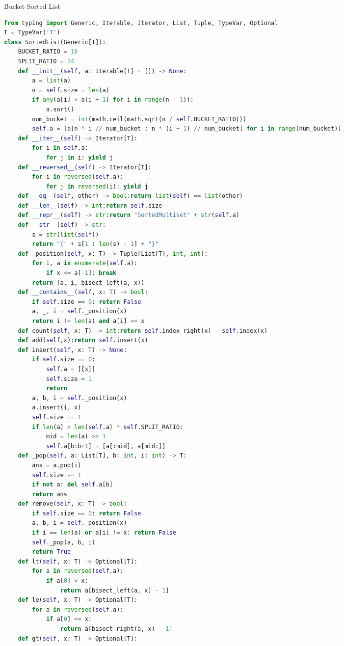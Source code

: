 \documentclass[10pt,landscape, a4paper]{article}
\begin{document}
\begin{multicols*}{3}
Bucket Sorted List
\begin{lstlisting}[language=Python]
from typing import Generic, Iterable, Iterator, List, Tuple, TypeVar, Optional
T = TypeVar('T')
class SortedList(Generic[T]):
    BUCKET_RATIO = 16
    SPLIT_RATIO = 24
    def __init__(self, a: Iterable[T] = []) -> None:
        a = list(a)
        n = self.size = len(a)
        if any(a[i] > a[i + 1] for i in range(n - 1)):
            a.sort()
        num_bucket = int(math.ceil(math.sqrt(n / self.BUCKET_RATIO)))
        self.a = [a[n * i // num_bucket : n * (i + 1) // num_bucket] for i in range(num_bucket)]
    def __iter__(self) -> Iterator[T]:
        for i in self.a:
            for j in i: yield j
    def __reversed__(self) -> Iterator[T]:
        for i in reversed(self.a):
            for j in reversed(i): yield j
    def __eq__(self, other) -> bool:return list(self) == list(other)
    def __len__(self) -> int:return self.size
    def __repr__(self) -> str:return "SortedMultiset" + str(self.a)
    def __str__(self) -> str:
        s = str(list(self))
        return "{" + s[1 : len(s) - 1] + "}"
    def _position(self, x: T) -> Tuple[List[T], int, int]:
        for i, a in enumerate(self.a):
            if x <= a[-1]: break
        return (a, i, bisect_left(a, x))
    def __contains__(self, x: T) -> bool:
        if self.size == 0: return False
        a, _, i = self._position(x)
        return i != len(a) and a[i] == x
    def count(self, x: T) -> int:return self.index_right(x) - self.index(x)
    def add(self,x):return self.insert(x)
    def insert(self, x: T) -> None:
        if self.size == 0:
            self.a = [[x]]
            self.size = 1
            return
        a, b, i = self._position(x)
        a.insert(i, x)
        self.size += 1
        if len(a) > len(self.a) * self.SPLIT_RATIO:
            mid = len(a) >> 1
            self.a[b:b+1] = [a[:mid], a[mid:]]
    def _pop(self, a: List[T], b: int, i: int) -> T:
        ans = a.pop(i)
        self.size -= 1
        if not a: del self.a[b]
        return ans
    def remove(self, x: T) -> bool:
        if self.size == 0: return False
        a, b, i = self._position(x)
        if i == len(a) or a[i] != x: return False
        self._pop(a, b, i)
        return True
    def lt(self, x: T) -> Optional[T]:
        for a in reversed(self.a):
            if a[0] < x:
                return a[bisect_left(a, x) - 1]
    def le(self, x: T) -> Optional[T]:
        for a in reversed(self.a):
            if a[0] <= x:
                return a[bisect_right(a, x) - 1]
    def gt(self, x: T) -> Optional[T]:

\end{lstlisting}
\end{multicols*}
\end{document}
